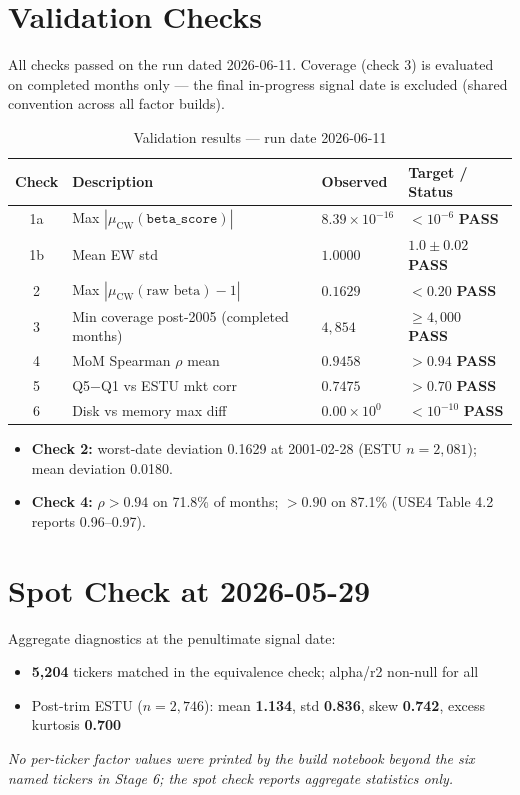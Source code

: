 \documentclass[11pt,a4paper]{article}
\newcommand{\PASS}[1]{\textcolor{pass}{\textbf{#1}}}
\newcommand{\NOTE}[1]{\textcolor{note}{\textit{#1}}}
\begin{document}
\section{Validation Checks}

All checks passed on the run dated 2026-06-11. Coverage (check 3) is evaluated
on completed months only --- the final in-progress signal date is excluded
(shared convention across all factor builds).

\begin{table}[h!]
\centering
\caption{Validation results --- run date 2026-06-11}
\small
\begin{tabular}{clll}
\toprule
\textbf{Check} & \textbf{Description} & \textbf{Observed} & \textbf{Target / Status} \\
\midrule
1a & Max $|\mu_{\text{CW}}(\texttt{beta\_score})|$ & $8.39\times10^{-16}$ & $<10^{-6}$ \quad \PASS{PASS} \\
1b & Mean EW std & $1.0000$ & $1.0\pm0.02$ \quad \PASS{PASS} \\
2 & Max $|\mu_{\text{CW}}(\text{raw beta})-1|$ & $0.1629$ & $<0.20$ \quad \PASS{PASS} \\
3 & Min coverage post-2005 (completed months) & $4{,}854$ & $\geq4{,}000$ \quad \PASS{PASS} \\
4 & MoM Spearman $\rho$ mean & $0.9458$ & $>0.94$ \quad \PASS{PASS} \\
5 & Q5$-$Q1 vs ESTU mkt corr & $0.7475$ & $>0.70$ \quad \PASS{PASS} \\
6 & Disk vs memory max diff & $0.00\times10^{0}$ & $<10^{-10}$ \quad \PASS{PASS} \\
\bottomrule
\end{tabular}
\end{table}

\begin{itemize}[leftmargin=*,topsep=2pt,itemsep=2pt]
  \item \textbf{Check 2:} worst-date deviation 0.1629 at 2001-02-28 (ESTU $n=2{,}081$); mean deviation 0.0180.
  \item \textbf{Check 4:} $\rho > 0.94$ on 71.8\% of months; $> 0.90$ on 87.1\% (USE4 Table 4.2 reports 0.96--0.97).
\end{itemize}

\section{Spot Check at 2026-05-29}

Aggregate diagnostics at the penultimate signal date:

\begin{itemize}[leftmargin=*,topsep=2pt,itemsep=2pt]
  \item \textbf{5{,}204} tickers matched in the equivalence check; alpha/r2 non-null for all
  \item Post-trim ESTU ($n=2{,}746$): mean \textbf{1.134}, std \textbf{0.836}, skew \textbf{0.742}, excess kurtosis \textbf{0.700}
\end{itemize}

\NOTE{No per-ticker factor values were printed by the build notebook
beyond the six named tickers in Stage 6; the spot check reports aggregate statistics only.}
\end{document}
